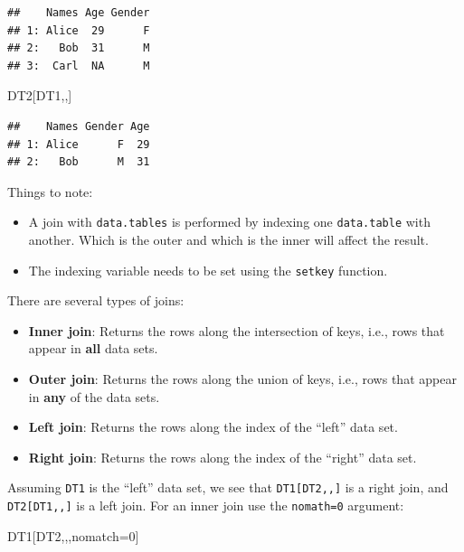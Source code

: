 \documentclass[]{book}
\newenvironment{Shaded}{\begin{snugshade}}{\end{snugshade}}
\newcommand{\DecValTok}[1]{\textcolor[rgb]{0.00,0.00,0.81}{#1}}
\newcommand{\NormalTok}[1]{#1}
\providecommand{\tightlist}{%
  \setlength{\itemsep}{0pt}\setlength{\parskip}{0pt}}
\theoremstyle{definition}
\theoremstyle{definition}
\theoremstyle{definition}
\theoremstyle{remark}
\begin{document}
\begin{verbatim}
##    Names Age Gender
## 1: Alice  29      F
## 2:   Bob  31      M
## 3:  Carl  NA      M
\end{verbatim}

\begin{Shaded}
\begin{Highlighting}[]
\NormalTok{DT2[DT1,,] }
\end{Highlighting}
\end{Shaded}

\begin{verbatim}
##    Names Gender Age
## 1: Alice      F  29
## 2:   Bob      M  31
\end{verbatim}

Things to note:

\begin{itemize}
\tightlist
\item
  A join with \texttt{data.tables} is performed by indexing one
  \texttt{data.table} with another. Which is the outer and which is the
  inner will affect the result.
\item
  The indexing variable needs to be set using the \texttt{setkey}
  function.
\end{itemize}

There are several types of joins:

\begin{itemize}
\tightlist
\item
  \textbf{Inner join}: Returns the rows along the intersection of keys,
  i.e., rows that appear in \textbf{all} data sets.
\item
  \textbf{Outer join}: Returns the rows along the union of keys, i.e.,
  rows that appear in \textbf{any} of the data sets.
\item
  \textbf{Left join}: Returns the rows along the index of the ``left''
  data set.
\item
  \textbf{Right join}: Returns the rows along the index of the ``right''
  data set.
\end{itemize}

Assuming \texttt{DT1} is the ``left'' data set, we see that
\texttt{DT1{[}DT2,,{]}} is a right join, and \texttt{DT2{[}DT1,,{]}} is
a left join. For an inner join use the \texttt{nomath=0} argument:

\begin{Shaded}
\begin{Highlighting}[]
\NormalTok{DT1[DT2,,,nomatch=}\DecValTok{0}\NormalTok{]}
\end{Highlighting}
\end{Shaded}
\end{document}
